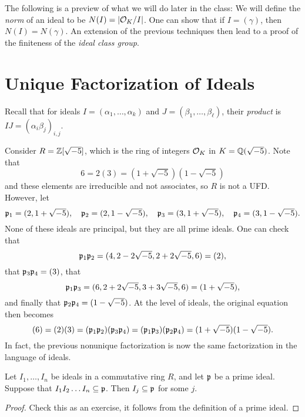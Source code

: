 \begin{remark}
  The following is a preview of what we will do
  later in the class: We will define the
  \emph{norm} of an ideal to be $N(I) = |\mathcal{O}_K / I|$.
  One can show that if $I = (\gamma)$, then
  $N(I) = N(\gamma)$. An extension of the previous
  techniques then lead to a proof of the finiteness
  of the \emph{ideal class group}.
\end{remark}

\section{Unique Factorization of Ideals}

\begin{remark}
  Recall that for ideals $I = (\alpha_1, \dots, \alpha_k)$
  and $J = (\beta_1, \dots, \beta_\ell)$, their
  \emph{product} is
  $IJ = (\alpha_i \beta_j)_{i, j}$.
\end{remark}

\begin{example}
  Consider $R = \mathbb{Z}[\sqrt{-5}]$, which is the
  ring of integers $\mathcal{O}_K$ in $K = \mathbb{Q}(\sqrt{-5})$.
  Note that
  \[
    6 = 2(3) = (1 + \sqrt{-5})(1 - \sqrt{-5})
  \]
  and these elements are irreducible and not associates,
  so $R$ is not a UFD. However, let
  \[
    \mathfrak{p}_1 = (2, 1 + \sqrt{-5}),
    \quad \mathfrak{p}_2 = (2, 1 - \sqrt{-5}),
    \quad \mathfrak{p}_3 = (3, 1 + \sqrt{-5}),
    \quad \mathfrak{p}_4 = (3, 1 - \sqrt{-5}).
  \]
  None of these ideals are principal, but they are
  all prime ideals. One can check that
  \[
    \mathfrak{p}_1 \mathfrak{p}_2 = (4, 2 - 2\sqrt{-5}, 2 + 2 \sqrt{-5}, 6) = (2),
  \]
  that
  $\mathfrak{p}_3 \mathfrak{p}_4 = (3)$, that
  \[
    \mathfrak{p}_1 \mathfrak{p}_3 = (6, 2 + 2 \sqrt{-5}, 3 + 3\sqrt{-5}, 6)
    = (1 + \sqrt{-5}),
  \]
  and finally that $\mathfrak{p}_2 \mathfrak{p}_4 = (1 - \sqrt{-5})$. At
  the level of ideals, the original equation then becomes
  \[
    (6) = (2)(3) = (\mathfrak{p}_1 \mathfrak{p}_2) (\mathfrak{p}_3 \mathfrak{p}_4)
    = (\mathfrak{p}_1 \mathfrak{p}_3) (\mathfrak{p}_2 \mathfrak{p}_4)
    = (1 + \sqrt{-5})(1 - \sqrt{-5}).
  \]
  In fact, the previous nonunique factorization is
  now the same factorization in the language of ideals.
\end{example}

\begin{lemma}
  Let $I_1, \dots, I_n$ be ideals in a commutative
  ring $R$, and let $\mathfrak{p}$ be a prime ideal. Suppose that
  $I_1 I_2 \dots I_n \subseteq \mathfrak{p}$. Then
  $I_j \subseteq \mathfrak{p}$ for some $j$.
\end{lemma}

\begin{proof}
  Check this as an exercise, it follows from the
  definition of a prime ideal.
\end{proof}

